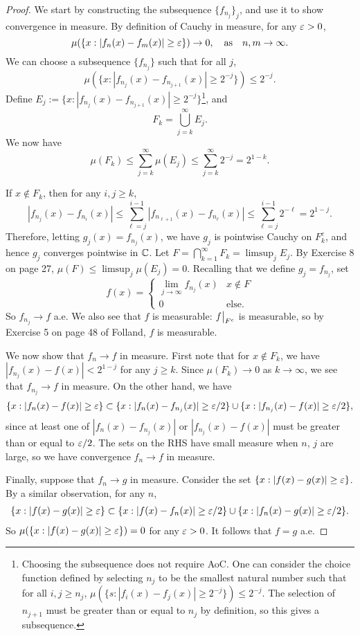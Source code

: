 \documentclass[12pt]{article} %
\begin{document}
\begin{proof}
    We start by constructing the subsequence $\{f_{n_j}\}_j$, and use it to show convergence in measure.
    By definition of Cauchy in measure, for any $\varepsilon > 0$, \[\mu(\{x : |f_n(x) - f_m(x)| \geq \varepsilon \}) \to 0, \ \ \ \text{as} \ \ \ n,m \to \infty.\] We can choose a subsequence $\{f_{n_j}\}$ such that for all $j$, \[\mu(\{x : |f_{n_j}(x) - f_{n_{j+1}}(x)| \geq 2^{-j} \}) \leq 2^{-j}.\] Define $E_j := \{x : |f_{n_j}(x) - f_{n_{j+1}}(x)| \geq 2^{-j} \}$\footnote{Choosing the subsequence does not require AoC. One can consider the choice function defined by selecting $n_j$ to be the smallest natural number such that for all $i,j \geq n_j$, $\mu\left(\{s : |f_i(x) - f_j(x)| \geq 2^{-j} \} \right) \leq 2^{-j}$. The selection of $n_{j+1}$ must be greater than or equal to $n_j$ by definition, so this gives a subsequence.}, and \[F_k = \bigcup_{j=k}^{\infty} E_j.\] We now have \[\mu(F_k) \leq \sum_{j=k}^{\infty} \mu(E_j) \leq \sum_{j=k}^{\infty} 2^{-j} = 2^{1-k}.\]

    If $x \notin F_k$, then for any $i, j \geq k$, \[|f_{n_j}(x) - f_{n_{i}}(x)| \leq \sum_{\ell = j}^{i-1} |f_{n_{\ell + 1}}(x) - f_{n_\ell}(x)| \leq \sum_{\ell = j}^{i-1} 2^{-\ell} = 2^{1-j}.\] Therefore, letting $g_j(x) = f_{n_j}(x)$, we have $g_j$ is pointwise Cauchy on $F_k^c$, and hence $g_j$ converges pointwise in $\mathbb{C}$. Let $F = \bigcap_{k=1}^{\infty} F_k = \limsup_j E_j$. By Exercise 8 on page 27, $\mu(F) \leq \limsup_j \mu(E_j) = 0$. Recalling that we define $g_j = f_{n_j}$, set \[f(x) = \begin{cases}
        \lim_{j \to \infty} f_{n_j}(x) &x \not\in F\\
        0 &\text{else}.
    \end{cases}\]
    So $f_{n_j} \to f$ a.e. We also see that $f$ is measurable: $\restr{f}{F^c}$ is measurable, so by Exercise 5 on page 48 of Folland, $f$ is measurable.
    
    We now show that $f_n \to f$ in measure. First note that for $x \not\in F_k$, we have $|f_{n_j}(x) - f(x)| < 2^{1-j}$ for any $j \geq k$. Since $\mu(F_k) \to 0$ as $k \to \infty$, we see that $f_{n_j} \to f$ in measure. On the other hand, we have \begin{align*}
        \{x : |f_n(x) - f(x)| \geq \varepsilon\} \subset \{x : |f_n(x) - f_{n_j}(x)| \geq \varepsilon/2\} \cup \{x : |f_{n_j}(x) - f(x)| \geq \varepsilon / 2\},
    \end{align*} since at least one of $|f_n(x) - f_{n_j}(x)|$ or $|f_{n_j}(x) - f(x)|$ must be greater than or equal to $\varepsilon / 2$. The sets on the RHS have small measure when $n$, $j$ are large, so we have convergence $f_n \to f$ in measure.

    Finally, suppose that $f_n \to g$ in measure. Consider the set $\{x : |f(x) - g(x)| \geq \varepsilon\}$. By a similar observation, for any $n$, \begin{align*}
        \{x : |f(x) - g(x)| \geq \varepsilon\} \subset \{x : |f(x) - f_{n}(x)| \geq \varepsilon/2\} \cup \{x : |f_{n}(x) - g(x)| \geq \varepsilon / 2\}.
    \end{align*} So $\mu(\{x : |f(x) - g(x)| \geq \varepsilon \}) = 0$ for any $\varepsilon > 0$. It follows that $f = g$ a.e.
\end{proof}
\end{document}
